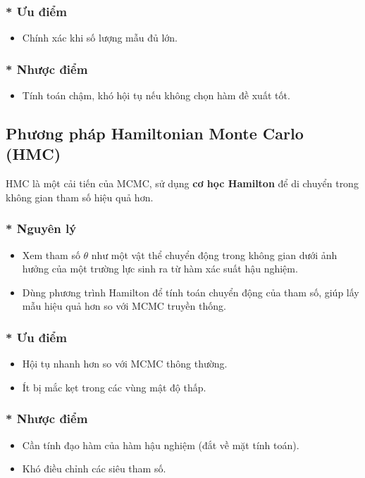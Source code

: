 \subsubsection{* Ưu điểm}
\begin{itemize}
    \item Chính xác khi số lượng mẫu đủ lớn.
\end{itemize}

\subsubsection{* Nhược điểm}
\begin{itemize}
    \item Tính toán chậm, khó hội tụ nếu không chọn hàm đề xuất tốt.
\end{itemize}

\subsection{Phương pháp Hamiltonian Monte Carlo (HMC)}
HMC là một cải tiến của MCMC, sử dụng \textbf{cơ học Hamilton} để di chuyển trong không gian tham số hiệu quả hơn.

\subsubsection{* Nguyên lý}  
\begin{itemize}
    \item Xem tham số $\theta$ như một vật thể chuyển động trong không gian dưới ảnh hưởng của một trường lực sinh ra từ hàm xác suất hậu nghiệm.
    \item Dùng phương trình Hamilton để tính toán chuyển động của tham số, giúp lấy mẫu hiệu quả hơn so với MCMC truyền thống.
\end{itemize}

\subsubsection{* Ưu điểm}
\begin{itemize}
    \item Hội tụ nhanh hơn so với MCMC thông thường.
    \item Ít bị mắc kẹt trong các vùng mật độ thấp.
\end{itemize}

\subsubsection{* Nhược điểm}
\begin{itemize}
    \item Cần tính đạo hàm của hàm hậu nghiệm (đắt về mặt tính toán).
    \item Khó điều chỉnh các siêu tham số.
\end{itemize}

